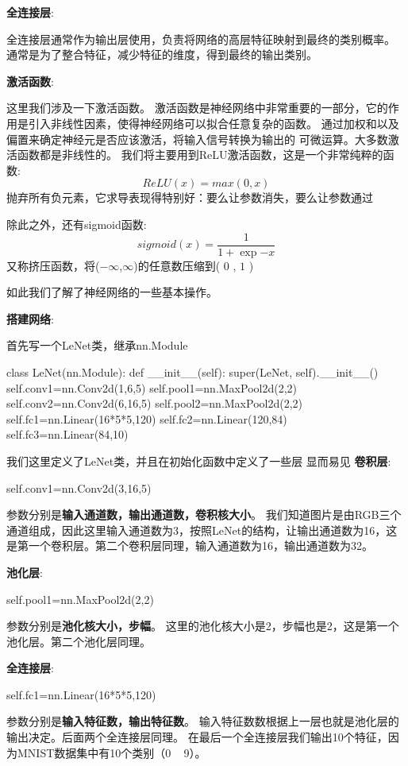 \textbf{全连接层}:

全连接层通常作为输出层使用，负责将网络的高层特征映射到最终的类别概率。
通常是为了整合特征，减少特征的维度，得到最终的输出类别。

\textbf{激活函数}:

这里我们涉及一下激活函数。
激活函数是神经网络中非常重要的一部分，它的作用是引入非线性因素，使得神经网络可以拟合任意复杂的函数。
通过加权和以及偏置来确定神经元是否应该激活，将输入信号转换为输出的
可微运算。大多数激活函数都是非线性的。
我们将主要用到ReLU激活函数，这是一个非常纯粹的函数:
\begin{equation}
    ReLU(x)=max(0,x)
\end{equation}
抛弃所有负元素，它求导表现得特别好：要么让参数消失，要么让参数通过

除此之外，还有sigmoid函数:
\begin{equation}
    sigmoid(x)=\frac{1}{1+\exp{-x}} 
\end{equation}
又称挤压函数，将($-\infty$,$\infty$)的任意数压缩到( $0$ , $1$ )

如此我们了解了神经网络的一些基本操作。

\textbf{搭建网络}:

首先写一个LeNet类，继承nn.Module
\begin{tpython}
    class LeNet(nn.Module):
        def __init__(self):
            super(LeNet, self).__init__()
            self.conv1=nn.Conv2d(1,6,5)
            self.pool1=nn.MaxPool2d(2,2)
            self.conv2=nn.Conv2d(6,16,5)
            self.pool2=nn.MaxPool2d(2,2)
            self.fc1=nn.Linear(16*5*5,120)
            self.fc2=nn.Linear(120,84)
            self.fc3=nn.Linear(84,10)
\end{tpython}

我们这里定义了LeNet类，并且在初始化函数中定义了一些层
显而易见
\textbf{卷积层}:
\begin{tpython}
    self.conv1=nn.Conv2d(3,16,5)
\end{tpython}
参数分别是\textbf{输入通道数，输出通道数，卷积核大小}。
我们知道图片是由RGB三个通道组成，因此这里输入通道数为3，按照LeNet的结构，让输出通道数为16，这是第一个卷积层。第二个卷积层同理，输入通道数为16，输出通道数为32。

\textbf{池化层}:
\begin{tpython}
    self.pool1=nn.MaxPool2d(2,2)
\end{tpython}
参数分别是\textbf{池化核大小，步幅}。
这里的池化核大小是2，步幅也是2，这是第一个池化层。第二个池化层同理。

\textbf{全连接层}:
\begin{tpython}
    self.fc1=nn.Linear(16*5*5,120)
\end{tpython}
参数分别是\textbf{输入特征数，输出特征数}。
输入特征数数根据上一层也就是池化层的输出决定。后面两个全连接层同理。
在最后一个全连接层我们输出10个特征，因为MNIST数据集中有10个类别（0 ~ 9）。

